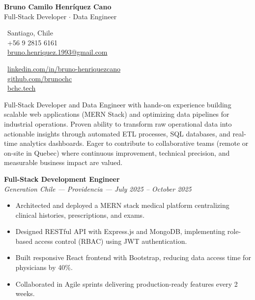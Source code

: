 \documentclass[10pt,letterpaper]{article}
\begin{document}
\begin{center}
    {\Huge \textbf{Bruno Camilo Henríquez Cano}} \\[0.2cm]
    {\Large Full-Stack Developer $\cdot$ Data Engineer}
\end{center}

\vspace{0.3cm}

\noindent
\begin{minipage}[t]{0.5\textwidth}
    \faMapMarker\ Santiago, Chile \\
    \faPhone\ +56 9 2815 6161 \\
    \faEnvelope\ \href{mailto:bruno.henriquez.1993@gmail.com}{bruno.henriquez.1993@gmail.com}
\end{minipage}
\begin{minipage}[t]{0.5\textwidth}
    \faLinkedin\ \href{https://linkedin.com/in/bruno-henriquezcano}{linkedin.com/in/bruno-henriquezcano} \\
    \faGithub\ \href{https://github.com/brunochc}{github.com/brunochc} \\
    \faGlobe\ \href{https://bchc.tech}{bchc.tech}
\end{minipage}

\vspace{0.4cm}


\vspace{0.2cm}

\noindent Full-Stack Developer and Data Engineer with hands-on experience building scalable web applications (MERN Stack) and optimizing data pipelines for industrial operations. Proven ability to transform raw operational data into actionable insights through automated ETL processes, SQL databases, and real-time analytics dashboards. Eager to contribute to collaborative teams (remote or on-site in Quebec) where continuous improvement, technical precision, and measurable business impact are valued.

\vspace{0.4cm}


\vspace{0.3cm}

\noindent \textbf{Full-Stack Development Engineer} \\
\textit{Generation Chile — Providencia — July 2025 – October 2025}
\begin{itemize}
    \item Architected and deployed a MERN stack medical platform centralizing clinical histories, prescriptions, and exams.
    \item Designed RESTful API with Express.js and MongoDB, implementing role-based access control (RBAC) using JWT authentication.
    \item Built responsive React frontend with Bootstrap, reducing data access time for physicians by 40\%.
    \item Collaborated in Agile sprints delivering production-ready features every 2 weeks.
\end{itemize}
\end{document}
